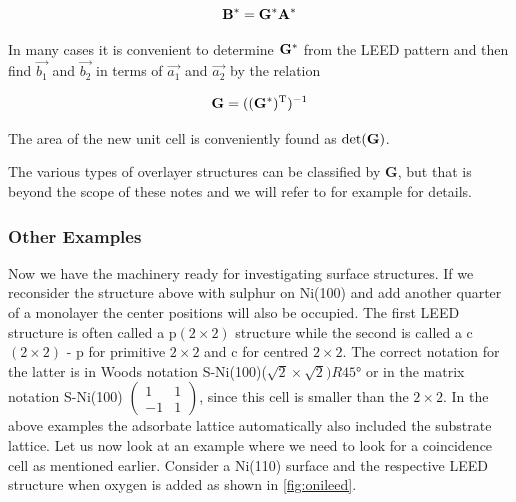 \begin{equation}
{\bf B^*}={\bf G^*A^*}
\end{equation}

In many cases it is convenient to determine ${\bf G^*}$ from the LEED pattern and then find $\vec{b_1}$ and $\vec{b_2}$ in terms of $\vec{a_1}$ and $\vec{a_2}$ by the relation

\begin{equation}
{\bf G}=(({\bf G^*})^{\mathrm{T}})^{-1}
\end{equation}

The area of the new unit cell is conveniently found as $\det({\bf G})$.

The various types of overlayer structures can be classified by {\bf G}, but that is beyond the scope of these notes and we will refer to for example \cite{Ertl, woodruff} for details.

\subsubsection{Other Examples}
Now we have the machinery ready for investigating surface structures. If we reconsider the structure above with sulphur on Ni(100) and add another quarter of a monolayer the center positions will also be occupied. The first LEED structure is often called a p$(2\times 2)$ structure while the second is called a c$(2\times 2)$ - p for primitive $2\times 2$ and c for centred $2\times 2$. The correct notation for the latter is in Woods notation S-Ni(100)($\sqrt{2}\times \sqrt{2})R\ang{45}$ or in the matrix notation S-Ni(100) $\left(\begin{smallmatrix} 1	& 1	\\ -1	& 1 \end{smallmatrix}\right)$, since this cell is smaller than the $2\times 2$. In the above examples the adsorbate lattice automatically also included the substrate lattice. Let us now look at an example where we need to look for a coincidence cell as mentioned earlier. Consider a Ni(110) surface and the respective LEED structure when oxygen is added as shown in \autoref{fig:onileed}.

